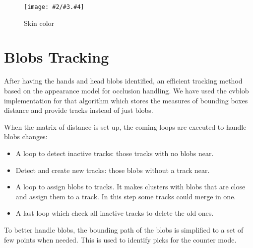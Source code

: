 \documentclass{llncs}
\newcommand{\imagepathext}[5]{%
\begin{figure}[!htbp]
\hfil\texttt{[image: \#2/\#3.\#4]}\hfil
\caption{#5\label{#3}}
\end{figure}}
\newcommand{\png}[2]{\imagepathext{width=\columnwidth}{pics}{#1}{png}{#2}}
\begin{document}
\png{skincolor}{Skin color}

\section{Blobs Tracking}
After having the hands and head blobs identified, an efficient
tracking method based on the appearance model for occlusion handling\cite{app06}.
We have used the cvblob implementation \cite{cvblob} for that algorithm which 
stores the measures of bounding boxes distance and provide tracks instead of just blobs.  %

When the matrix of distance is set up, the coming loops
are executed to handle blobs changes:
\begin{itemize}
 \item A loop to detect inactive tracks: those tracks with no blobs near.
 \item Detect and create new tracks: those blobs without a track near.
 \item A loop to assign blobs to tracks. It makes clusters with blobs that are close and assign them to a track.
In this step some tracks could merge in one.
 \item A last loop which check all inactive tracks to delete the old ones.
\end{itemize}

To better handle blobs, the bounding path of the blobs
is simplified to a set of few points when needed.
This is used to identify picks for the counter mode.
\end{document}
